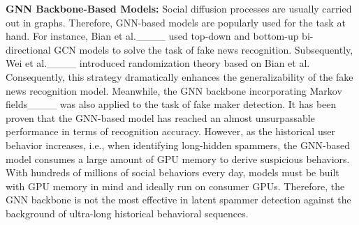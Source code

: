 \par \textbf{GNN Backbone-Based Models:} Social diffusion processes are usually carried out in graphs. Therefore, GNN-based models are popularly used for the task at hand. For instance, Bian et al.____ used top-down and bottom-up bi-directional GCN models to solve the task of fake news recognition. Subsequently, Wei et al.____ introduced randomization theory based on Bian et al. Consequently, this strategy dramatically enhances the generalizability of the fake news recognition model. Meanwhile, the GNN backbone incorporating Markov fields____ was also applied to the task of fake maker detection. It has been proven that the GNN-based model has reached an almost unsurpassable performance in terms of recognition accuracy. However, as the historical user behavior increases, i.e., when identifying long-hidden spammers, the GNN-based model consumes a large amount of GPU memory to derive suspicious behaviors. With hundreds of millions of social behaviors every day, models must be built with GPU memory in mind and ideally run on consumer GPUs. Therefore, the GNN backbone is not the most effective in latent spammer detection against the background of ultra-long historical behavioral sequences.
